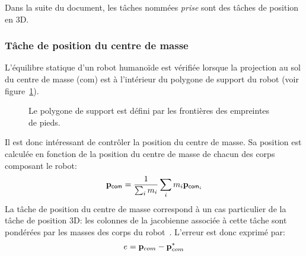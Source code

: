 Dans la suite du document, les t\^aches nommées \emph{prise} sont des t\^aches
de position en 3D. 

\subsubsection{T\^ache de position du centre de masse}
L'équilibre statique d'un robot humanoïde est vérifiée lorsque la 
projection au sol du centre de masse (com) est à l'intérieur du polygone de support du robot
(voir figure~\ref{fig:supportPoly}).
\begin{figure}[t]
  \begin{center}
    \resizebox{0.3\textwidth}{!}{
    
    }
  \end{center}
  \caption{Le polygone de support est défini par les frontières des empreintes de pieds.}
  \label{fig:supportPoly}
\end{figure}
Il est donc intéressant de contrôler la position du centre de masse. Sa position est
calculée en fonction de la position du centre de masse de chacun des corps composant le robot:
\begin{equation}
  \mbf{p}_{\textsf{com}} = \frac{1}{\sum_i m_i} \sum_i m_i\mbf{p}_{\textsf{com}_i}
  \label{eq:com}
\end{equation}
La t\^ache de position du centre de masse correspond à un cas particulier 
de la t\^ache de position 3D: les colonnes de la jacobienne associée 
à cette t\^ache sont pondérées par les masses des corps du robot~\cite{boulic96, sugihara02}.
L'erreur est donc exprimé par:
\begin{equation}
e = \mbf{p}_{com} - \mbf{p}_{com}^*
\label{eq:taskCom}
\end{equation}

